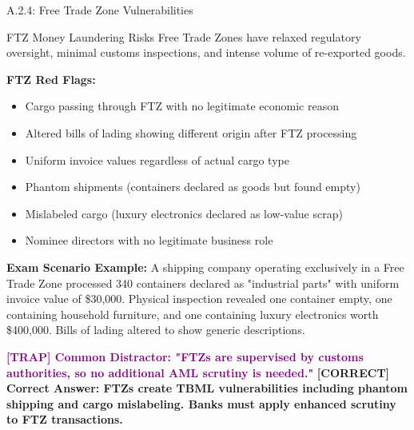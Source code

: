 \documentclass[11pt,a4paper]{beamer}
\newcommand{\trap}[1]{\textcolor{purple}{\textbf{[TRAP] #1}}}
\newcommand{\correct}[1]{\textcolor{green!50!black}{\textbf{[CORRECT] #1}}}
\begin{document}
	\begin{frame}{A.2.4: Free Trade Zone Vulnerabilities}
		\begin{block}{FTZ Money Laundering Risks}
			Free Trade Zones have relaxed regulatory oversight, minimal customs inspections, and intense volume of re-exported goods.
		\end{block}
		\textbf{FTZ Red Flags:}
		\begin{itemize}
			\item Cargo passing through FTZ with no legitimate economic reason
			\item Altered bills of lading showing different origin after FTZ processing
			\item Uniform invoice values regardless of actual cargo type
			\item Phantom shipments (containers declared as goods but found empty)
			\item Mislabeled cargo (luxury electronics declared as low-value scrap)
			\item Nominee directors with no legitimate business role
		\end{itemize}
		\textbf{Exam Scenario Example:}
		A shipping company operating exclusively in a Free Trade Zone processed 340 containers declared as "industrial parts" with uniform invoice value of \$30,000. Physical inspection revealed one container empty, one containing household furniture, and one containing luxury electronics worth \$400,000. Bills of lading altered to show generic descriptions.
		
		\trap{Common Distractor: "FTZs are supervised by customs authorities, so no additional AML scrutiny is needed."}
		\correct{Correct Answer: FTZs create TBML vulnerabilities including phantom shipping and cargo mislabeling. Banks must apply enhanced scrutiny to FTZ transactions.}
	\end{frame}
	
	
\end{document}
